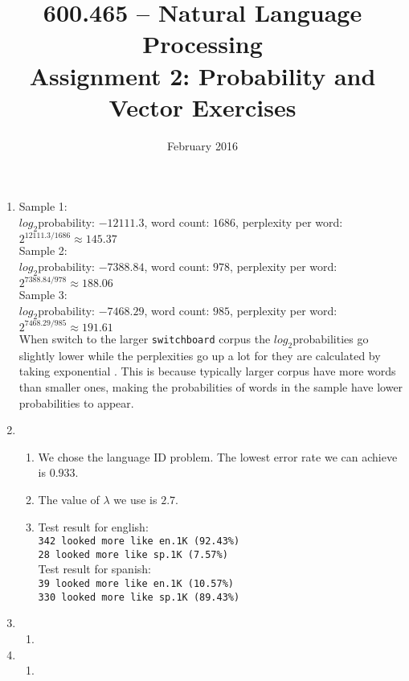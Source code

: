 \documentclass[10pt]{article}
\title{600.465 -- Natural Language Processing\\
Assignment 2: Probability and Vector Exercises}
\author{}
\date{February 2016}
\begin{document}
\maketitle
\begin{enumerate}
    \item  %
    Sample 1:\\ $log_2$probability: $-12111.3$, word count: $1686$, perplexity per word: $2^{12111.3/1686} \approx 145.37$\\
    Sample 2:\\ $log_2$probability: $-7388.84$, word count: $978$, perplexity per word: $2^{7388.84/978} \approx 188.06$\\
    Sample 3:\\ $log_2$probability: $-7468.29$, word count: $985$, perplexity per word: $2^{7468.29/985} \approx 191.61$\\
    
    When switch to the larger {\tt switchboard} corpus the $log_2$probabilities go slightly lower while the perplexities go up a lot for they are calculated by taking exponential . This is because typically larger corpus have more words than smaller ones, making the probabilities of words in the sample have lower probabilities to appear. 
    
     \addtocounter{enumi}{1}
     \item %
     	\begin{enumerate}
     		\item
     		We chose the language ID problem. The lowest error rate we can achieve is $0.933$.
     		\item
     		The value of $\lambda$ we use is $2.7$.
     		\item
     		Test result for english:\\
     		\texttt{342 looked more like en.1K (92.43\%)\\
     		28 looked more like sp.1K (7.57\%)  }\\
     		Test result for spanish:\\
     		\texttt{39 looked more like en.1K (10.57\%)\\
     		330 looked more like sp.1K (89.43\%) }
     		
     	\end{enumerate}
     
    \item %
    	\begin{enumerate}{(b)}
            \item
         \end{enumerate}  

	\item %
    	\begin{enumerate}
        	\item
        \end{enumerate}
        
\end{enumerate}
\end{document}
